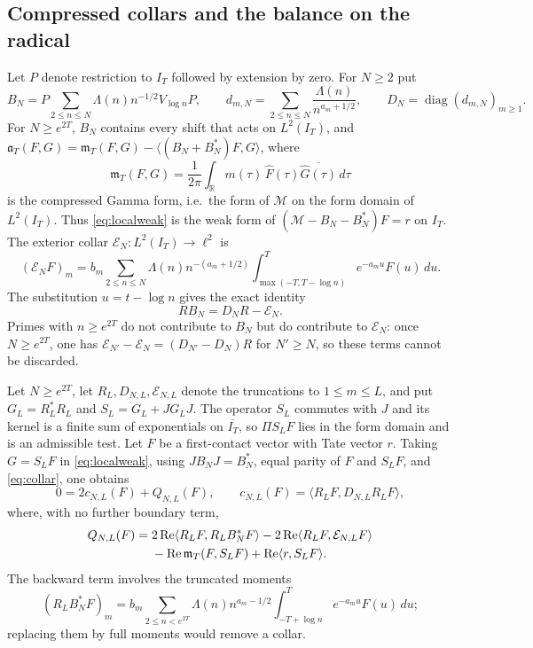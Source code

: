 \documentclass[11pt]{amsart}
\theoremstyle{definition}
\theoremstyle{remark}
\newcommand{\R}{\mathbb R}
\newcommand{\Rel}{\operatorname{Re}}
\newcommand{\IT}{I_T}
\newcommand{\Fh}{\widehat F}
\begin{document}
\subsection{Compressed collars and the balance on the radical}\label{subsec:collars}

Let $P$ denote restriction to $\IT$ followed by extension by zero. For $N\ge2$ put
\[
 B_N=P\sum_{2\le n\le N}\Lambda(n)n^{-1/2}V_{\log n}P,\qquad
 d_{m,N}=\sum_{2\le n\le N}\frac{\Lambda(n)}{n^{a_m+1/2}},\qquad
 D_N=\operatorname{diag}(d_{m,N})_{m\ge1}.
\]
For $N\ge e^{2T}$, $B_N$ contains every shift that acts on $L^2(\IT)$, and
$\mathfrak a_T(F,G)=\mathfrak m_T(F,G)-\langle(B_N+B_N^*)F,G\rangle$, where
\[
 \mathfrak m_T(F,G)=\frac1{2\pi}\int_\R m(\tau)\,\Fh(\tau)\overline{\widehat G(\tau)}\,d\tau
\]
is the compressed Gamma form, i.e.\ the form of $\mathcal M$ on the form domain of $L^2(\IT)$.
Thus \eqref{eq:localweak} is the weak form of $(\mathcal M-B_N-B_N^*)F=r$ on $\IT$.
The exterior collar $\mathcal E_N:L^2(\IT)\to\ell^2$ is
\[
 (\mathcal E_NF)_m=b_m\sum_{2\le n\le N}\Lambda(n)n^{-(a_m+1/2)}
 \int_{\max(-T,T-\log n)}^T e^{-a_mu}F(u)\,du.
\]
The substitution $u=t-\log n$ gives the exact identity
\begin{equation}\label{eq:collar}
 RB_N=D_NR-\mathcal E_N.
\end{equation}
Primes with $n\ge e^{2T}$ do not contribute to $B_N$ but do contribute to $\mathcal E_N$: once
$N\ge e^{2T}$, one has $\mathcal E_{N'}-\mathcal E_N=(D_{N'}-D_N)R$ for $N'\ge N$, so these terms
cannot be discarded.

Let $N\ge e^{2T}$, let $R_L,D_{N,L},\mathcal E_{N,L}$ denote the truncations to $1\le m\le L$, and put
$G_L=R_L^*R_L$ and $S_L=G_L+JG_LJ$. The operator $S_L$ commutes with $J$ and its kernel is a finite
sum of exponentials on $\overline{\IT}$, so $\Pi S_LF$ lies in the form domain and is an admissible
test. Let $F$ be a first-contact vector with Tate vector $r$. Taking $G=S_LF$ in
\eqref{eq:localweak}, using $JB_NJ=B_N^*$, equal parity of $F$ and $S_LF$, and \eqref{eq:collar}, one
obtains
\begin{equation}\label{eq:Qbalance}
 0=2c_{N,L}(F)+Q_{N,L}(F),\qquad
 c_{N,L}(F)=\langle R_LF,D_{N,L}R_LF\rangle,
\end{equation}
where, with no further boundary term,
\begin{align}\label{eq:Qfull}
 Q_{N,L}(F)={}&2\Rel\langle R_LF,R_LB_N^*F\rangle
 -2\Rel\langle R_LF,\mathcal E_{N,L}F\rangle\notag\\
 &-\Rel\mathfrak m_T(F,S_LF)+\Rel\langle r,S_LF\rangle.
\end{align}
The backward term involves the truncated moments
\[
 (R_LB_N^*F)_m=b_m\sum_{2\le n<e^{2T}}
 \Lambda(n)n^{a_m-1/2}\int_{-T+\log n}^T e^{-a_mu}F(u)\,du;
\]
replacing them by full moments would remove a collar.
\end{document}
